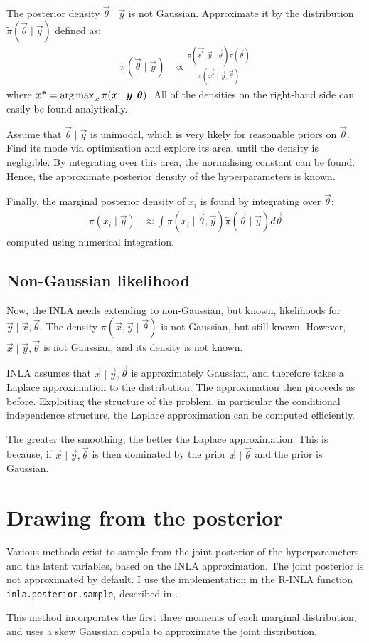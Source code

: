 \documentclass[thesis.tex]{subfiles}
\begin{document}
The posterior density $\vec{\theta }\mid \vec{y}$ is not Gaussian.
Approximate it by the distribution $\tilde\pi(\vec{\theta} \mid \vec{y})$ defined as:
\begin{align}
\tilde\pi(\vec{\theta} \mid \vec{y})
&\propto \frac{\pi(\vec{x^*}, \vec{y} \mid \vec{\theta}) \pi(\vec{\theta})}{\pi(\vec{x^*} \mid \vec{y}, \vec{\theta})}
\end{align}
where $\bm{x^*} = \operatorname*{arg\,max}_{\bm{x}} \pi(\bm{x} \mid \bm{y}, \bm{\theta})$.
All of the densities on the right-hand side can easily be found analytically.

Assume that $\vec{\theta} \mid \vec{y}$ is unimodal, which is very likely for reasonable priors on $\vec{\theta}$.
Find its mode via optimisation and explore its area, until the density is negligible.
By integrating over this area, the normalising constant can be found.
Hence, the approximate posterior density of the hyperparameters is known.

Finally, the marginal posterior density of $x_i$ is found by integrating over $\vec{\theta}$:
\begin{align}
\pi(x_i \mid \vec{y})
&\approx \int \pi(x_i \mid \vec{\theta}, \vec{y}) \tilde\pi(\vec{\theta} \mid \vec{y}) d\vec{\theta}
\end{align}
computed using numerical integration.

\subsection{Non-Gaussian likelihood}

Now, the INLA needs extending to non-Gaussian, but known, likelihoods for $\vec{y} \mid \vec{x}, \vec{\theta}$.
The density $\pi(\vec{x}, \vec{y} \mid \vec{\theta})$ is not Gaussian, but still known.
However, $\vec{x} \mid \vec{y}, \vec{\theta}$ is not Gaussian, and its density is not known.

INLA assumes that $\vec{x} \mid \vec{y}, \vec{\theta}$ is approximately Gaussian, and therefore takes a Laplace approximation to the distribution.
The approximation then proceeds as before.
Exploiting the structure of the problem, in particular the conditional independence structure, the Laplace approximation can be computed efficiently.

The greater the smoothing, the better the Laplace approximation.
This is because, if $\vec{x} \mid \vec{y}, \vec{\theta}$ is then dominated by the prior $\vec{x} \mid \vec{\theta}$ and the prior is Gaussian.

\section{Drawing from the posterior} \label{transmission:sec:INLA:posterior}

Various methods exist to sample from the joint posterior of the hyperparameters and the latent variables, based on the INLA approximation.
The joint posterior is not approximated by default.
I use the implementation in the R-INLA function \texttt{inla.posterior.sample}, described in \textcite[section 4]{chiuchioloJoint}.

This method incorporates the first three moments of each marginal distribution, and uses a skew Gaussian copula to approximate the joint distribution.
\end{document}
